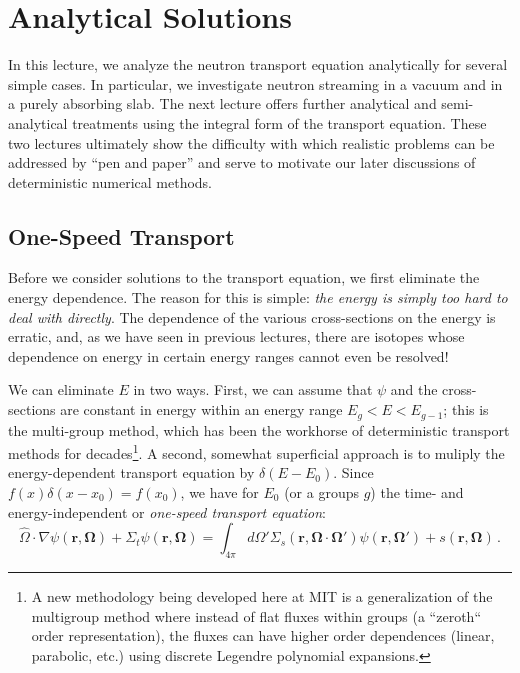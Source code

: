 \chapter{Analytical Solutions}
\label{lec:analytical}

In this lecture, we analyze the neutron transport equation analytically for several simple cases.  In particular, we investigate neutron streaming in a vacuum and in a purely absorbing slab.  The next lecture offers further analytical and semi-analytical treatments using the integral form of the transport equation.  These two lectures ultimately show the difficulty with which realistic problems can be addressed by ``pen and paper'' and serve to motivate our later discussions of deterministic numerical methods.

\section*{One-Speed Transport}

Before we consider solutions to the transport equation, we first eliminate the energy dependence.  The reason for this is simple: \textit{the energy is simply too hard to deal with directly}.  The dependence of the various cross-sections on the energy is erratic, and, as we have seen in previous lectures, there are isotopes whose dependence on energy in certain energy ranges cannot even be resolved!

We can eliminate $E$ in two ways.  First, we can assume that $\psi$ and the cross-sections are constant in energy within an energy range $E_g < E < E_{g-1}$; this is the multi-group method, which has been the workhorse of deterministic transport methods for decades\footnote{A new methodology being developed here at MIT is a generalization of the multigroup method where instead of flat fluxes within groups (a ``zeroth`` order representation), the fluxes can have higher order dependences (linear, parabolic, etc.) using discrete Legendre polynomial expansions.}.  A second, somewhat superficial approach is to muliply the energy-dependent transport equation by $\delta(E-E_0)$.   Since $f(x)\delta(x-x_0) = f(x_0)$, we have for $E_0$ (or a groups $g$) the time- and energy-independent or \textit{one-speed transport equation}:
\begin{equation}
     \hat{\Omega} \cdot \nabla \psi(\mathbf{r},\mathbf{\Omega})  + \Sigma_t \psi(\mathbf{r},\mathbf{\Omega}) =   \int_{4\pi} d\Omega' \Sigma_s(\mathbf{r},\mathbf{\Omega}\cdot\mathbf{\Omega}')\psi(\mathbf{r},\mathbf{\Omega'}) + s(\mathbf{r},\mathbf{\Omega})  \, .
\end{equation}

